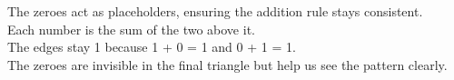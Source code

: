 \documentclass[preview]{standalone}
\begin{document}
\begin{center}
The zeroes act as placeholders, ensuring the addition rule stays consistent.\\Each number is the sum of the two above it.\\The edges stay 1 because 1 + 0 = 1 and 0 + 1 = 1.\\The zeroes are invisible in the final triangle but help us see the pattern clearly.
\end{center}
\end{document}
